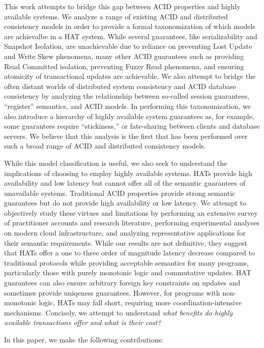 This work attempts to bridge this gap between ACID properties and
highly available systems. We analyze a range of existing ACID and
distributed consistency models in order to provide a formal
taxonomization of which models are achievalbe in a HAT system.  While
several guarantees, like serializability and Snapshot Isolation, are
unachievable due to reliance on preventing Lost Update and Write Skew
phenomena, many other ACID guarantees such as providing Read Committed
isolation, preventing Fuzzy Read phenomena, and ensuring atomicity of
transactional updates are achievable. We also attempt to bridge the
often distant worlds of distributed system consistency and ACID
database consistency by analyzing the relationship between so-called
session guarantees, ``register'' semantics, and ACID models. In
performing this taxonomization, we also introduce a hierarchy of
highly available system guarantees as, for example, some guarantees
require ``stickiness,'' or fate-sharing between clients and database
servers. We believe that this analysis is the first that has been
performed over such a broad range of ACID and distributed consistency
models.

While this model classification is useful, we also seek to understand
the implications of choosing to employ highly available systems. HATs
provide high availability and low latency but cannot offer all of the
semantic guarantees of unavailable systems. Traditional ACID
properties provide strong semantic guarantees but do not provide high
availability or low latency. We attempt to objectively study these
virtues and limitations by performing an extensive survey of
practitioner accounts and research literature, performing experimental
analyses on modern cloud infrastructure, and analyzing representative
applications for their semantic requirements. While our results are
not definitive, they suggest that HATs offer a one to three order of
magnitude latency decrease compared to traditional protocols while
providing acceptable semantics for many programs, particularly those
with purely monotonic logic and commutative updates. HAT guarantees
can also ensure arbitrary foreign key constraints on updates and
sometimes provide uniqeness guarantees. However, for programs with
non-monotonic logic, HATs may fall short, requiring more
coordination-intensive mechanisms. Concisely, we attempt to understand
\textit{what benefits do highly available transactions offer and what
  is their cost?}

In this paper, we make the following contributions:

